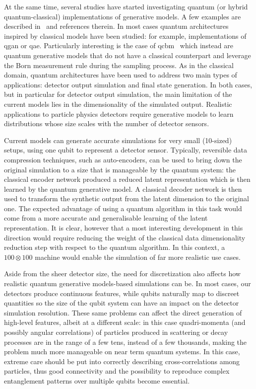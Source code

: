 At the same time, several studies have started investigating quantum (or hybrid quantum-classical) implementations of generative models. A few examples are described in~\cite{arxiv.2203.08805} and references therein. In most cases quantum architectures inspired by classical models have been studied: for example, implementations of \gls{qgan} or \gls{qae}.  Particularly interesting is the case of \gls{qcbm}~\cite{qcbm} which instead are quantum generative models that do not have a classical counterpart and leverage the Born measurement rule during the sampling process. 
As in the classical domain, quantum architectures have been used to address two main types of applications: detector output simulation and final state generation. In both cases, but in particular for detector output simulation, the main limitation of the current models lies in the dimensionality of the simulated output. Realistic applications to particle physics detectors require generative models to learn distributions whose size scales with the number of detector sensors. 

 Current models can generate accurate simulations for very small (10-sized) setups, using one qubit to represent a detector sensor. Typically, reversible data compression techniques, such as auto-encoders,  can be used to bring down the original simulation to a size that is manageable by the quantum system: the classical encoder network produced a reduced latent representation which is then learned by the quantum generative model. A classical decoder network is then used to transform the synthetic output from the latent dimension to the original one. The expected advantage of using a quantum algorithm in this task would come from a more accurate and generalisable learning of the latent representation. It is clear, however that a most interesting development in this direction would require reducing the weight of the classical data dimensionality reduction step with respect to the quantum algorithm. In this context, a $100 \otimes 100$ machine would enable the simulation of far more realistic use cases.
 
Aside from the sheer detector size, the need for discretization also affects how realistic quantum generative models-based simulations can be. In most cases, our detectors produce continuous features, while qubits  naturally map to discreet quantities so the size of the qubit system can have an impact on the detector simulation resolution. 
These same problems can affect the direct generation of high-level features, albeit at a different scale: in this case quadri-momenta (and possibly angular correlations) of particles produced in scattering or decay processes are in the range of a few tens, instead of a few thousands, making the problem much more manageable on near term quantum systems. In this case, extreme care should be put into correctly describing cross-correlations among particles, thus good connectivity and the possibility to reproduce complex entanglement patterns over multiple qubits become essential.

